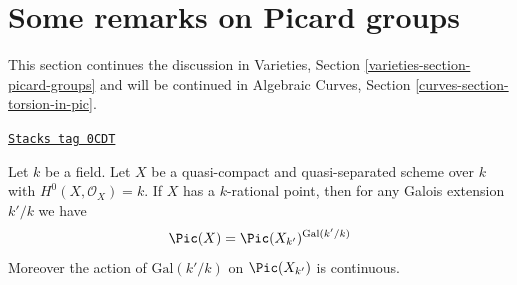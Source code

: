 \section{Some remarks on Picard groups}
\label{pic-section-remarks-picard}
This section continues the discussion in
Varieties, Section \ref{varieties-section-picard-groups}
and will be continued in
Algebraic Curves, Section \ref{curves-section-torsion-in-pic}.

\begin{lemma}
\label{pic-lemma-pic-descends}
\href{https://stacks.math.columbia.edu/tag/0CDT}{\texttt{Stacks tag 0CDT}}

Let $k$ be a field. Let $X$ be a quasi-compact and quasi-separated scheme
over $k$ with $H^0(X, \mathcal{O}_X) = k$. If $X$ has a $k$-rational point,
then for any Galois extension $k'/k$ we have
$$
\Pic(X) = \Pic(X_{k'})^{\text{Gal}(k'/k)}
$$
Moreover the action of $\text{Gal}(k'/k)$ on $\Pic(X_{k'})$
is continuous.
\end{lemma}

